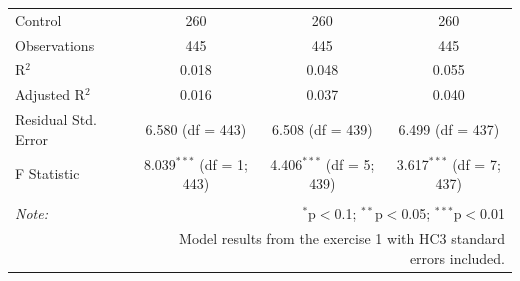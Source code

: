\begin{table}[!htbp]
\begin{tabular}{@{\extracolsep{5pt}}lccc}
Control & 260 & 260 & 260 \\ 
Observations & 445 & 445 & 445 \\ 
R$^{2}$ & 0.018 & 0.048 & 0.055 \\ 
Adjusted R$^{2}$ & 0.016 & 0.037 & 0.040 \\ 
Residual Std. Error & 6.580 (df = 443) & 6.508 (df = 439) & 6.499 (df = 437) \\ 
F Statistic & 8.039$^{***}$ (df = 1; 443) & 4.406$^{***}$ (df = 5; 439) & 3.617$^{***}$ (df = 7; 437) \\ 
\hline 
\hline \\[-1.8ex] 
\textit{Note:}  & \multicolumn{3}{r}{$^{*}$p$<$0.1; $^{**}$p$<$0.05; $^{***}$p$<$0.01} \\ 
 & \multicolumn{3}{r}{Model results from the exercise 1 with HC3 standard errors included.} \\ 
\end{tabular} 
\end{table} 
